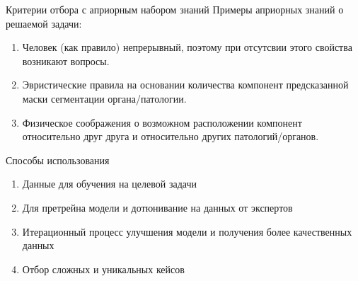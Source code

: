 \documentclass[10pt]{beamer}
\theoremstyle{definition}
\begin{document}
	\begin{frame}{Критерии отбора с априорным набором знаний}
		Примеры априорных знаний о решаемой задачи:
        \begin{enumerate}
            \item Человек (как правило) непрерывный, поэтому при отсутсвии этого свойства возникают вопросы.
            \item Эвристические правила на основании количества компонент предсказанной маски сегментации органа/патологии.
            \item Физическое соображения о возможном расположении компонент относительно друг друга и относительно других патологий/органов.
        \end{enumerate}
        
	\end{frame}

        \begin{frame}{Способы использования}
            \begin{enumerate}
                \item Данные для обучения на целевой задачи
                \item Для претрейна модели и дотюнивание на данных от экспертов
                \item Итерационный процесс улучшения модели и получения более качественных данных
                \item Отбор сложных и уникальных кейсов
            \end{enumerate}
        \end{frame}
	
\end{document}
